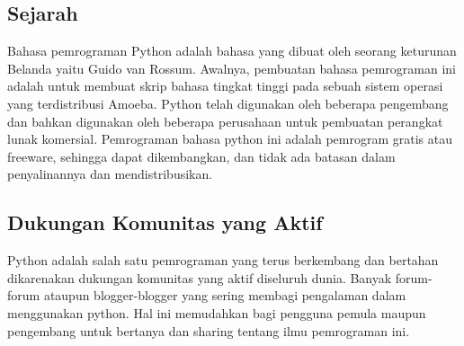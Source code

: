 \subsection {Sejarah}
Bahasa pemrograman Python adalah bahasa yang dibuat oleh seorang keturunan Belanda yaitu Guido van Rossum. Awalnya, pembuatan bahasa pemrograman ini adalah untuk membuat skrip bahasa tingkat tinggi pada sebuah sistem operasi yang terdistribusi Amoeba. Python telah digunakan oleh beberapa pengembang dan bahkan digunakan oleh beberapa perusahaan untuk pembuatan perangkat lunak komersial. Pemrograman bahasa python ini adalah pemrogram gratis atau freeware, sehingga dapat dikembangkan, dan tidak ada batasan dalam penyalinannya dan mendistribusikan. 
\subsection{Dukungan Komunitas yang Aktif}
Python adalah salah satu pemrograman yang terus berkembang dan bertahan dikarenakan dukungan komunitas yang aktif diseluruh dunia. Banyak forum-forum ataupun blogger-blogger yang sering membagi pengalaman dalam menggunakan python. Hal ini memudahkan bagi pengguna pemula maupun pengembang untuk bertanya dan sharing tentang ilmu pemrograman ini. 
